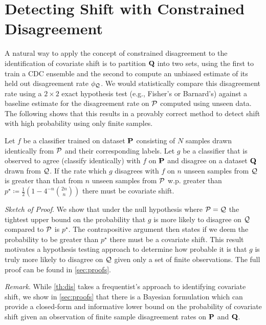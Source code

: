 \section{Detecting Shift with Constrained Disagreement}\label{sec:from-constrained-disagreement-to-detecting-shift-with-hypothesis-tests}
A natural way to apply the concept of constrained disagreement to the identification of covariate shift is
to partition $\mathbf{Q}$ into two sets, using the first to train a CDC ensemble and the second to compute an unbiased estimate
of its held out disagreement rate $\phi_{\mathcal{Q}}$.
We would statistically compare this disagreement rate using a $2\times 2$ exact hypothesis test (e.g., Fisher's or Barnard's) against a baseline estimate for the disagreement rate on $\mathcal{P}$ computed using unseen data.
The following shows that this results in a provably correct method to detect shift with high probability using only finite samples.
\begin{theorem}
    \label{th:dis}
    Let $f$ be a classifier trained on dataset $\mathbf{P}$ consisting of $N$ samples drawn identically from $\mathcal{P}$ and their corresponding labels.
    Let $g$ be a classifier that is observed to agree (classify identically) with $f$ on $\mathbf{P}$ and disagree on a dataset $\mathbf{Q}$ drawn from $\mathcal{Q}$.
    If the rate which $g$ disagrees with $f$ on $n$ unseen samples from $\mathcal{Q}$ is greater than that from $n$ unseen samples from $\mathcal{P}$ w.p. greater than $p^\star \coloneqq \frac{1}{2}\left(1- 4^{-n} \binom{2n}{n}\right)$ there must be covariate shift.
\end{theorem}
\textit{Sketch of Proof}.
We show that under the null hypothesis where $\mathcal{P} = \mathcal{Q}$ the tightest upper bound on the probability that $g$ is more likely to disagree on $\mathcal{Q}$ compared to $\mathcal{P}$ is $p^\star$.
The contrapositive argument then states
if we deem the probability to be greater than $p^\star$ there must be a covariate shift.
This result motivates a hypothesis testing approach to determine how probable it is that $g$ is truly more likely to disagree on $\mathcal{Q}$ given only a set of finite observations.
The full proof can be found in \autoref{sec:proofs}.


\textit{Remark}.
While \autoref{th:dis} takes a frequentist's approach to identifying covariate shift, we show in \autoref{sec:proofs} that there is a Bayesian formulation which can provide a closed-form and informative lower bound on the probability
of covariate shift given an observation of finite sample disagreement rates on $\mathbf{P}$ and $\mathbf{Q}$.

